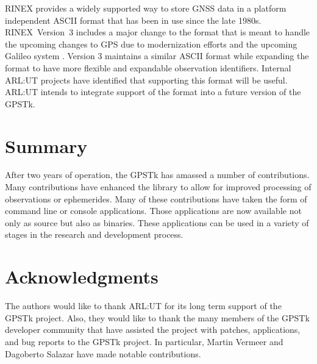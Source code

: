 \documentclass{ion-gps}
\begin{document}
RINEX provides a widely
supported way to store GNSS data in a platform independent ASCII
format that has been in use since the late
1980s\cite{rinex1format}. RINEX~Version~3 includes a major change to the
format that is meant to handle the upcoming changes to GPS due to
modernization efforts and the upcoming Galileo system
\cite{rinex300format}. Version 3 maintains a similar ASCII format while
expanding the format to have more flexible and expandable
observation identifiers.  Internal ARL:UT projects have identified
that supporting this format will be useful.  ARL:UT intends to
integrate support of the format into a future version of the GPSTk.

\section*{Summary}

After two years of operation, the GPSTk has amassed a number of
contributions. Many contributions have enhanced the library to allow
for improved processing of observations or ephemerides. Many of these
contributions have taken the form of command line or console
applications. Those applications are now available not only as source
but also as binaries. These applications can be used in a
variety of stages in the research and development process.

\section*{Acknowledgments}
The authors would like to thank ARL:UT for its long term support of
the GPSTk project.  Also, they would like to thank the many members of
the GPSTk developer community that have assisted the project with
patches, applications, and bug reports to the GPSTk project. In
particular, Martin Vermeer and Dagoberto Salazar have made notable
contributions.

\begin{flushleft}



\end{flushleft}
\end{document}
